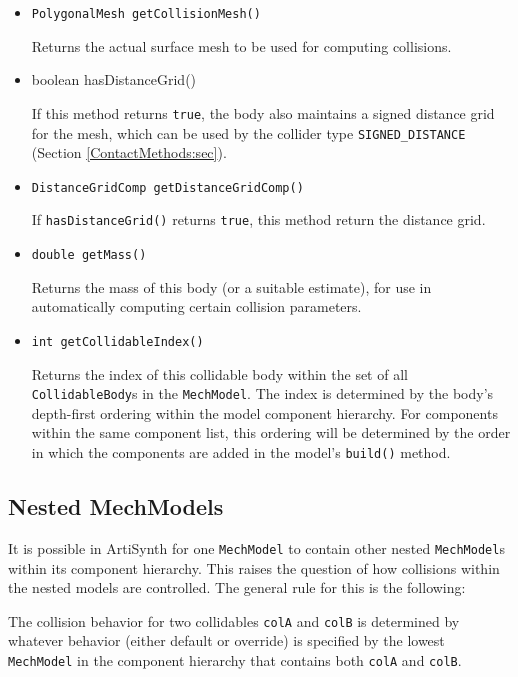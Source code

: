 \begin{itemize}

\item {\tt PolygonalMesh getCollisionMesh()}

Returns the actual surface mesh to be used for computing collisions.

\item {boolean hasDistanceGrid()}

If this method returns {\tt true}, the body also maintains a signed
distance grid for the mesh, which can be used by the collider type
{\tt SIGNED\_DISTANCE} (Section
\ref{ContactMethods:sec}).

\item {\tt DistanceGridComp getDistanceGridComp()}

If {\tt hasDistanceGrid()} returns {\tt true}, this method return the
distance grid.

\item {\tt double getMass()}

Returns the mass of this body (or a suitable estimate), for use
in automatically computing certain collision parameters.

\item {\tt int getCollidableIndex()}

Returns the index of this collidable body within the set of all {\tt
CollidableBody}s in the {\tt MechModel}. The index is determined by
the body's depth-first ordering within the model component
hierarchy. For components within the same component list, this ordering
will be determined by the order in which the components are added in
the model's {\tt build()} method.

\end{itemize}
%

\subsection{Nested MechModels}

It is possible in ArtiSynth for one {\tt MechModel} to contain other
nested {\tt MechModel}s within its component hierarchy. This raises
the question of how collisions within the nested models are
controlled. The general rule for this is the following:

\begin{sideblock}
The collision behavior for two collidables {\tt colA} and {\tt colB}
is determined by whatever behavior (either default or override) is
specified by the lowest {\tt MechModel} in the component hierarchy
that contains both {\tt colA} and {\tt colB}.
\end{sideblock}

